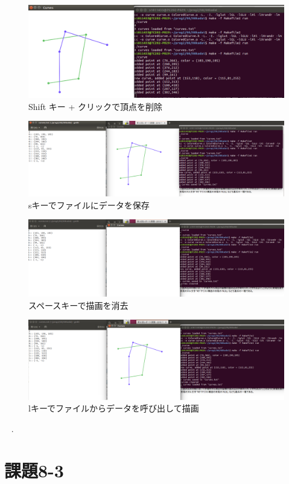 \documentclass[10pt,a4paper]{jsarticle}
\begin{document}
\begin{figure}[h!p]
  \includegraphics[width=0.8\linewidth]{03.png}
  \caption{Shift キー + クリックで頂点を削除}
  \label{fig:sutehage}
\end{figure}
\begin{figure}[h!p]
  \includegraphics[width=0.8\linewidth]{04.png}
  \caption{sキーでファイルにデータを保存}
  \label{fig:sutehage}
\end{figure}
\begin{figure}[h!p]
  \includegraphics[width=0.8\linewidth]{05.png}
  \caption{スペースキーで描画を消去}
  \label{fig:sutehage}
\end{figure}
\begin{figure}[h!p]
  \includegraphics[width=0.8\linewidth]{06.png}
  \caption{lキーでファイルからデータを呼び出して描画}
  \label{fig:sutehage}
\end{figure}
\
\newpage
.
\newpage


\section{課題8-3}
\end{document}
